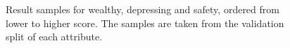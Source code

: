 \begin{figure}[ht]
	\centering
	\hspace{0mm}
	\hspace{0mm}
	\caption[Result samples]{
		Result samples for wealthy, depressing and safety, ordered from lower to higher score.
		The samples are taken from the validation split of each attribute.
		}
\end{figure}
\label{fig:samples_1}


